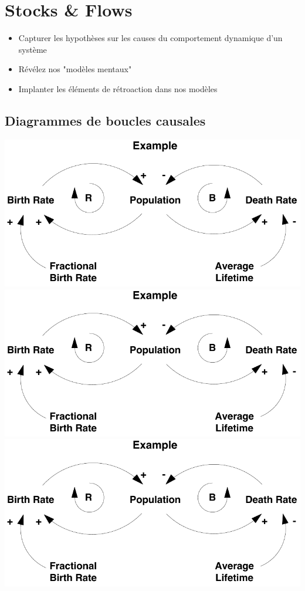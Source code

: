 \documentclass[resume]{subfiles}
\begin{document}
\section{Stocks \& Flows}
\begin{itemize}
\item Capturer les hypothèses sur les causes du
  comportement dynamique d'un système
\item Révélez nos "modèles mentaux"
\item Implanter les éléments de rétroaction dans nos modèles  
\end{itemize}


\subsection{Diagrammes de boucles causales}
\begin{center}
\includegraphics[scale=0.4,page=1]{img_0.pdf}\\
\includegraphics[scale=0.4,page=2]{img_0.pdf}\\
\includegraphics[scale=0.4,page=3]{img_0.pdf}\\

\end{center}
\end{document}
